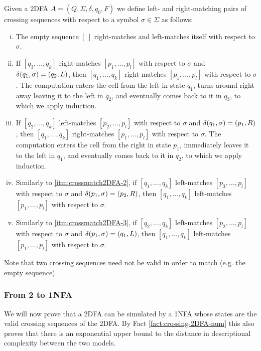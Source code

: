 \begin{defn}
	Given a 2DFA $A=(Q,\Sigma,\delta,q_0,F)$ we define left- and right-matching pairs of crossing sequences with respect to a symbol $\sigma\in\Sigma$ as follows:
	\begin{enumerate}[i.]
		\item The empty sequence $[~]$ right-matches and left-matches itself with respect to $\sigma$.
		\item \label{itm:crossmatch2DFA-2} If $[q_3,\dots,q_k]$ right-matches $[p_1,\dots,p_l]$ with respect to $\sigma$ and $\delta(q_1,\sigma)=(q_2,L)$, then $[q_1,\dots,q_k]$ right-matches $[p_1,\dots,p_l]$ with respect to $\sigma$. The computation enters the cell from the left in state $q_1$, turns around right away leaving it to the left in $q_2$, and eventually comes back to it in $q_3$, to which we apply induction.
		\item \label{itm:crossmatch2DFA-3} If $[q_2,\dots,q_k]$ left-matches $[p_2,\dots,p_l]$ with respect to $\sigma$ and $\delta(q_1,\sigma)=(p_1,R)$, then $[q_1,\dots,q_k]$ right-matches $[p_1,\dots,p_l]$ with respect to $\sigma$. The computation enters the cell from the right in state $p_1$, immediately leaves it to the left in $q_1$, and eventually comes back to it in $q_2$, to which we apply induction.
		\item Similarly to \ref{itm:crossmatch2DFA-2}, if $[q_1,\dots,q_k]$ left-matches $[p_3,\dots,p_l]$ with respect to $\sigma$ and $\delta(p_1,\sigma)=(p_2,R)$, then $[q_1,\dots,q_k]$ left-matches $[p_1,\dots,p_l]$ with respect to $\sigma$.
		\item Similarly to \ref{itm:crossmatch2DFA-3}, if $[q_2,\dots,q_k]$ left-matches $[p_2,\dots,p_l]$ with respect to $\sigma$ and $\delta(p_1,\sigma)=(q_1,L)$, then $[q_1,\dots,q_k]$ left-matches $[p_1,\dots,p_l]$ with respect to $\sigma$.
	\end{enumerate}
\end{defn}
Note that two crossing sequences need not be valid in order to match (e.g. the empty sequence).

\subsubsection{From 2\DFAs{} to 1NFA}
We will now prove that a 2DFA can be simulated by a 1NFA whose states are the valid crossing sequences of the 2DFA.
By Fact \ref{fact:crossing-2DFA-num} this also proves that there is an exponential upper bound to the distance in descriptional complexity between the two models.

